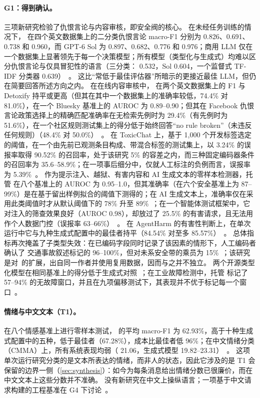 \paragraph{G1：得到确认。}
三项新研究检验了仇恨言论与内容审核，即安全阀的核心。
在未经任务训练的情况下，\jev{} 在四个英文数据集上的二分类仇恨言论 macro-F1 分别为 0.826、0.691、0.738 和 0.960，而 GPT-6 Sol 为 0.897、0.682、0.776 和 0.976；商用 LLM 仅在一个数据集上显著领先于每一个决策模型；所有模型（类型化与生成式）均难以区分仇恨言论与仅具冒犯性的语言（三分类：\jev{} 0.532，Sol 0.604，一个监督式 TF-IDF 分类器 0.639）~\cite{arx03324}。
这比“常低于最佳评估器”所暗示的更接近最佳 LLM，但仍在简要回答所述方向之内。
在在线内容审核中，\jev{} 在两个英文数据集上的 F1 与 Detoxify 持平或更高（但其在其中一个数据集上的准确率较低，74.4\% 对 81.0\%），在一个 Bluesky 基准上的 AUROC 为 0.89--0.90；但其在 Facebook 仇恨言论政策选择上的精确匹配准确率在无检索先例时为 29.4\%（有先例时为 51.6\%），在一个社区规则测试集上的得分低于始终回答“no rule broken”（未违反任何规则）（48.4\% 对 50.0\%）~\cite{arx07953}。
在 ToxicChat 上，基于 1{,}000 个开发标签选定的阈值，在一个由先前已观测条目构成、带混合标签的测试集上，以 3.24\% 的误报率取得 90.52\% 的召回率，处于该研究 5\% 的容差之内，而三种固定编码器条件的召回率为 35.6--58.9\%；在一项事后细分中，仅就人工标注的负例而言，误报率为 5.39\%~\cite{zen23075657}\zmark{}。
作为提示注入、越狱、有害内容和 AI 生成文本的零样本检测器，托管 \jev{} 在八个基准上的 AUROC 为 0.95--1.0，但其准确率（在六个安全基准上为 87--99\%）是在基于留出样例拟合的阈值下测得的；在 AI 生成文本上，准确率仅在采用此类阈值时才从默认阈值下的 78\% 升至 89\%~\cite{arx04985}；在一个智能体测试框架中，它对注入的筛查效果良好（AUROC 0.98），却放过了 25.5\% 的有害请求，且无法用作个人数据门控（误报率 63--66\%）~\cite{arx02267}。
在 AgentHarm 的有害性判断上，在单次运行中它与九种生成式配置中的最佳者持平（84.54\% 对至多 85.57\%）~\cite{arx03935}。
总体指标再次掩盖了子类型失效：在已编码字段同时记录了该因素的情形下，人工编码者确认了 \jev{} 交通事故叙述标记的 96--100\%，但对未系安全带的乘员为 15\%~\cite{arx10321}；该研究是对~\cite{arx24052}的扩展，出自同一作者并使用复用数据，因而与之并不独立。
两个开源类型化模型在相同基准上的得分低于生成式对照~\cite{arx06744,arx07177}；在工业故障检测中，托管 \jev{} 标记了 57--94\% 的无故障窗口，并且在九项偏移测试下，其表现并不优于标记每一个窗口~\cite{arx09937}。

\paragraph{情绪与中文文本（T1）。}
在八个情感基准上进行零样本测试，\jev{} 的平均 macro-F1 为 62.93\%，高于十种生成式配置中的五种，低于最佳者（67.28\%），成本比最佳者低 96\%；在中文情绪分类（CMMA）上，所有系统表现均弱（\jev{} 21.06，生成式模型 19.82--23.31）~\cite{arx08829}。
这项单次运行研究分类的是文本所表达的情绪，而非人的状态，因此它涉及的是 T1 会保留的边界一侧（\cref{sec:synthesis}）：如今为每条消息给出情绪分数已很廉价，而在中文文本上这些分数并不准确。
没有新研究在中文上操纵语言；一项基于中文请求构建的工程基准在 G4 下讨论~\cite{arx09896}。

